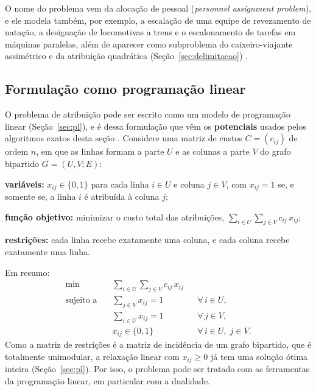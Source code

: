 O nome do problema vem da alocação de pessoal (\textit{personnel assignment problem}), e ele modela também, por exemplo, a escalação de uma equipe de revezamento de natação, a designação de locomotivas a trens e o escalonamento de tarefas em máquinas paralelas, além de aparecer como subproblema do caixeiro-viajante assimétrico e da atribuição quadrática (Seção~\ref{sec:delimitacao}) \cite{burkard}.

\subsection{Formulação como programação linear}
\label{sec:lap_pl}

O problema de atribuição pode ser escrito como um modelo de programação linear (Seção~\ref{sec:pl}), e é dessa formulação que vêm os \textbf{potenciais} usados pelos algoritmos exatos desta seção \cite{burkard}. Considere uma matriz de custos $C = (c_{ij})$ de ordem $n$, em que as linhas formam a parte $U$ e as colunas a parte $V$ do grafo bipartido $G = (U, V; E)$:
\begin{alineas}
    \item \textbf{variáveis:} $x_{ij} \in \{0, 1\}$ para cada linha $i \in U$ e coluna $j \in V$, com $x_{ij} = 1$ se, e somente se, a linha $i$ é atribuída à coluna $j$;
    \item \textbf{função objetivo:} minimizar o custo total das atribuições, $\sum_{i \in U} \sum_{j \in V} c_{ij}\, x_{ij}$;
    \item \textbf{restrições:} cada linha recebe exatamente uma coluna, e cada coluna recebe exatamente uma linha.
\end{alineas}
Em resumo:
\begin{equation}
    \begin{aligned}
        \min \quad & \sum_{i \in U} \sum_{j \in V} c_{ij}\, x_{ij} \\
        \text{sujeito a} \quad & \sum_{j \in V} x_{ij} = 1 && \forall\, i \in U, \\
        & \sum_{i \in U} x_{ij} = 1 && \forall\, j \in V, \\
        & x_{ij} \in \{0, 1\} && \forall\, i \in U, \; j \in V.
    \end{aligned}
    \label{eq:lap_primal}
\end{equation}
Como a matriz de restrições é a matriz de incidência de um grafo bipartido, que é totalmente unimodular, a relaxação linear com $x_{ij} \ge 0$ já tem uma solução ótima inteira (Seção~\ref{sec:pl}). Por isso, o problema pode ser tratado com as ferramentas da programação linear, em particular com a dualidade.

